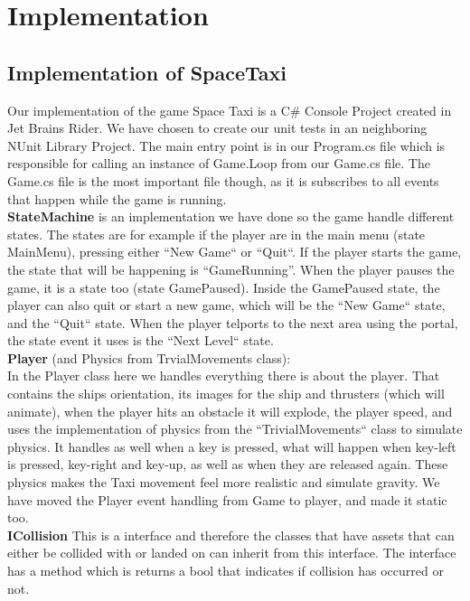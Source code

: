 \documentclass[../master.tex]{subfiles}
\begin{document}
\section{Implementation}
\subsection{Implementation of SpaceTaxi}
Our implementation of the game Space Taxi is a C\# Console Project created in Jet Brains Rider. We have chosen to create our unit tests in an neighboring NUnit Library Project. The main entry point is in our Program.cs file which is responsible for calling an instance of Game.Loop from our Game.cs file. The Game.cs file is the most important file though, as it is subscribes to all events that happen while the game is running.\\

\textbf{StateMachine}
is an implementation we have done so the game handle different states. The states are for example if the player are in the main menu (state MainMenu), pressing either ``New Game`` or ``Quit``. If the player starts the game, the state that will be happening is ``GameRunning''. When the player pauses the game, it is a state too (state GamePaused). Inside the GamePaused state, the player can also quit or start a new game, which will be the ``New Game`` state, and the ``Quit`` state. When the player telports to the next area using the portal, the state event it uses is the ``Next Level`` state.\\

\textbf{Player} (and Physics from TrvialMovements class):\\
In the Player class here we handles everything there is about the player. That contains the ships orientation, its images for the ship and thrusters (which will animate), when the player hits an obstacle it will explode, the player speed, and uses the implementation of physics from the ``TrivialMovements`` class to simulate physics. It handles as well when a key is pressed, what will happen when key-left is pressed, key-right and key-up, as well as when they are released again. These physics makes the Taxi movement feel more realistic and simulate gravity. We have moved the Player event handling from Game to player, and made it static too.\\

\textbf{ICollision}
This is a interface and therefore the classes that have assets that can either be collided with or landed on can inherit from this interface. The interface has a method which is returns a bool that indicates if collision has occurred or not.
\end{document}
